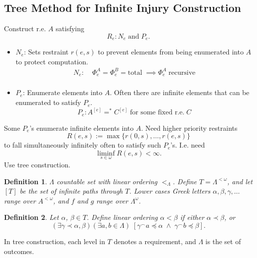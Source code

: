 \documentclass{article}
\newtheorem{definition}{Definition}[subsection]
\begin{document}
\subsection{Tree Method for Infinite Injury Construction}
  \label{section:infinite-injury}
  Construct r.e. $A$ satisfying
  \[R_e: N_e\; \text{and}\; P_e.\]
  \begin{itemize}
    \item $N_e$: Sets restraint $r(e,s)$ to prevent elements from being
      enumerated into $A$ to protect computation.
      \begin{align*}
        N_e:& \;\Phi_e^A=\Phi_e^B=\text{total}\; \implies
          \Phi_e^A\;\text{recursive}\\
      \end{align*}

    \item $P_e$: Enumerate elements into $A$. Often there are
      infinite elements that can be enumerated to satisfy $P_e$.
      \[P_e: A^{[e]} =^* C^{[e]}\; \text{for some fixed r.e.}\; C\]
  \end{itemize}

  Some $P_e$'s enumerate infinite elements into $A$. Need
  higher priority restraints
  \[R(e,s) := \max\{r(0,s),\ldots,r(e,s)\}\]
  to fall simultaneously infinitely often to satisfy such $P_e$'s. I.e.
  need
  \begin{equation}
    \liminf_{s\in\omega} R(e,s) <\infty.
    \label{eqn:liminf}
  \end{equation}
  Use tree construction.

  \begin{definition}
    $\Lambda$ countable set with linear ordering $<_\Lambda$. Define
    $T=\Lambda^{<\omega}$, and let $[T]$ be the set of infinite paths
    through $T$. Lower cases Greek letters $\alpha,\beta,\gamma,\ldots$
    range over $A^{<\omega}$, and $f$ and $g$ range over $\Lambda^\omega$.
  \end{definition}

  \begin{definition}
    Let $\alpha$, $\beta\in T$. Define linear ordering $\alpha<\beta$
    if either $\alpha \prec \beta$, or
    \[(\exists \gamma \prec \alpha, \beta) (\exists a,b \in \Lambda)\;
    [\gamma^\frown a \preceq\alpha\; \wedge\; \gamma^\frown b
    \preceq\beta].\]
  \end{definition}

  In tree construction, each level in $T$ denotes a requirement,
  and $\Lambda$ is the set of outcomes.
\end{document}
